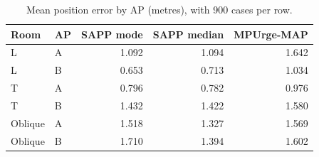 \begin{table}[H]
\centering
\caption{Mean position error by AP (metres), with 900 cases per row.}
\label{tab:ap}
\setlength{\tabcolsep}{4pt}
\begin{tabular}{llrrr}
\toprule
Room & AP & SAPP mode & SAPP median & MPUrge-MAP\\
\midrule
L & A & 1.092 & 1.094 & 1.642\\
L & B & 0.653 & 0.713 & 1.034\\
T & A & 0.796 & 0.782 & 0.976\\
T & B & 1.432 & 1.422 & 1.580\\
Oblique & A & 1.518 & 1.327 & 1.569\\
Oblique & B & 1.710 & 1.394 & 1.602\\
\bottomrule
\end{tabular}
\end{table}
